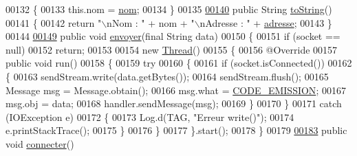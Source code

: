 \begin{DoxyCode}
00132     \{
00133         this.nom = \hyperlink{classcom_1_1lasalle_1_1io__trucks_1_1_peripherique_a57ad735952307998eddf5277be95ec95}{nom};
00134     \}
00135 
\hyperlink{classcom_1_1lasalle_1_1io__trucks_1_1_peripherique_a3ce69dc3b561771d428523f8df08cbc9}{00140}     \textcolor{keyword}{public} String \hyperlink{classcom_1_1lasalle_1_1io__trucks_1_1_peripherique_a3ce69dc3b561771d428523f8df08cbc9}{toString}()
00141     \{
00142         \textcolor{keywordflow}{return} \textcolor{stringliteral}{"\(\backslash\)nNom : "} + nom + \textcolor{stringliteral}{"\(\backslash\)nAdresse : "} + \hyperlink{classcom_1_1lasalle_1_1io__trucks_1_1_peripherique_a0f0c207b12d3aded58623cfe0f9cd6d2}{adresse};
00143     \}
00144 
\hyperlink{classcom_1_1lasalle_1_1io__trucks_1_1_peripherique_a7f691381f5164b92f8ff3f06561db656}{00149}     \textcolor{keyword}{public} \textcolor{keywordtype}{void} \hyperlink{classcom_1_1lasalle_1_1io__trucks_1_1_peripherique_a7f691381f5164b92f8ff3f06561db656}{envoyer}(\textcolor{keyword}{final} String data)
00150     \{
00151         \textcolor{keywordflow}{if} (socket == null)
00152             \textcolor{keywordflow}{return};
00153 
00154         \textcolor{keyword}{new} \hyperlink{class_thread}{Thread}()
00155         \{
00156             @Override
00157             \textcolor{keyword}{public} \textcolor{keywordtype}{void} run()
00158             \{
00159                 \textcolor{keywordflow}{try}
00160                 \{
00161                     \textcolor{keywordflow}{if} (socket.isConnected())
00162                     \{
00163                         sendStream.write(data.getBytes());
00164                         sendStream.flush();
00165                         Message msg = Message.obtain();
00166                         msg.what = \hyperlink{classcom_1_1lasalle_1_1io__trucks_1_1_peripherique_aad9e383353fd86265a2eeeac2d2c901f}{CODE\_EMISSION};
00167                         msg.obj = data;
00168                         handler.sendMessage(msg);
00169                     \}
00170                 \}
00171                 \textcolor{keywordflow}{catch} (IOException e)
00172                 \{
00173                     Log.d(TAG, \textcolor{stringliteral}{"Erreur write()"});
00174                     e.printStackTrace();
00175                 \}
00176             \}
00177         \}.start();
00178     \}
00179 
\hyperlink{classcom_1_1lasalle_1_1io__trucks_1_1_peripherique_ab2c35019f3ba71ec1b3b59470dc383ae}{00183}     \textcolor{keyword}{public} \textcolor{keywordtype}{void} \hyperlink{classcom_1_1lasalle_1_1io__trucks_1_1_peripherique_ab2c35019f3ba71ec1b3b59470dc383ae}{connecter}()

\end{DoxyCode}
